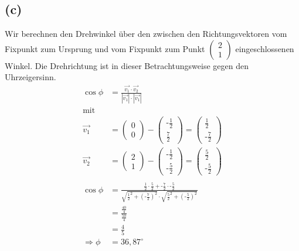 \documentclass[a4paper]{scrartcl}
\begin{document}
\subsection*{(c)}
Wir berechnen den Drehwinkel über den zwischen den Richtungsvektoren vom Fixpunkt zum Ursprung und vom Fixpunkt zum Punkt $\left(\begin{matrix} 2 \\ 1 \end{matrix}\right)$ eingeschlossenen Winkel. Die Drehrichtung ist in dieser Betrachtungsweise gegen den Uhrzeigersinn.
\begin{align*}
\cos\phi & = \frac{\vec{v_1}\cdot\vec{v_2}}{\left|\vec{v_1}\right|\cdot\left|\vec{v_1}\right|} \\
\text{mit} \\
\vec{v_1} & = \left(\begin{matrix} 0 \\ 0 \end{matrix}\right)
- \left(\begin{matrix} \text{-}\frac{1}{2} \\ \frac{7}{2} \end{matrix}\right) 
= \left(\begin{matrix} \frac{1}{2} \\ \text{-}\frac{7}{2} \end{matrix}\right) \\
\vec{v_2} & = \left(\begin{matrix} 2 \\ 1 \end{matrix}\right)
- \left(\begin{matrix} \text{-}\frac{1}{2} \\ \text{-}\frac{5}{2} \end{matrix}\right) 
= \left(\begin{matrix} \frac{5}{2} \\ \text{-}\frac{5}{2} \end{matrix}\right) \\
\\
\cos\phi & = \frac{\frac{1}{2}\cdot\frac{5}{2} + \text{-}\frac{7}{2} \cdot \text{-}\frac{5}{2}}
{\sqrt{\frac{1}{2}^2 + \left(\text{-}\frac{7}{2}\right)^2} \cdot \sqrt{\frac{5}{2}^2 + \left(\text{-}\frac{5}{2}\right)^2}} \\
 & = \frac{\frac{40}{4}}{\frac{50}{4}} \\
 & = \frac{4}{5} \\
\Longrightarrow \phi & = 36,87^\circ
\end{align*}
\end{document}
